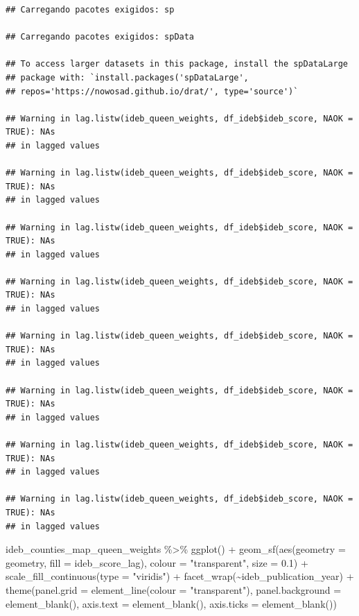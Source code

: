 \documentclass[
]{article}
\newenvironment{Shaded}{\begin{snugshade}}{\end{snugshade}}
\newcommand{\AttributeTok}[1]{\textcolor[rgb]{0.77,0.63,0.00}{#1}}
\newcommand{\FloatTok}[1]{\textcolor[rgb]{0.00,0.00,0.81}{#1}}
\newcommand{\FunctionTok}[1]{\textcolor[rgb]{0.00,0.00,0.00}{#1}}
\newcommand{\NormalTok}[1]{#1}
\newcommand{\SpecialCharTok}[1]{\textcolor[rgb]{0.00,0.00,0.00}{#1}}
\newcommand{\StringTok}[1]{\textcolor[rgb]{0.31,0.60,0.02}{#1}}
\begin{document}
\begin{verbatim}
## Carregando pacotes exigidos: sp

## Carregando pacotes exigidos: spData

## To access larger datasets in this package, install the spDataLarge
## package with: `install.packages('spDataLarge',
## repos='https://nowosad.github.io/drat/', type='source')`

## Warning in lag.listw(ideb_queen_weights, df_ideb$ideb_score, NAOK = TRUE): NAs
## in lagged values

## Warning in lag.listw(ideb_queen_weights, df_ideb$ideb_score, NAOK = TRUE): NAs
## in lagged values

## Warning in lag.listw(ideb_queen_weights, df_ideb$ideb_score, NAOK = TRUE): NAs
## in lagged values

## Warning in lag.listw(ideb_queen_weights, df_ideb$ideb_score, NAOK = TRUE): NAs
## in lagged values

## Warning in lag.listw(ideb_queen_weights, df_ideb$ideb_score, NAOK = TRUE): NAs
## in lagged values

## Warning in lag.listw(ideb_queen_weights, df_ideb$ideb_score, NAOK = TRUE): NAs
## in lagged values

## Warning in lag.listw(ideb_queen_weights, df_ideb$ideb_score, NAOK = TRUE): NAs
## in lagged values

## Warning in lag.listw(ideb_queen_weights, df_ideb$ideb_score, NAOK = TRUE): NAs
## in lagged values
\end{verbatim}

\begin{Shaded}
\begin{Highlighting}[]
\NormalTok{ideb\_counties\_map\_queen\_weights }\SpecialCharTok{\%\textgreater{}\%}
  \FunctionTok{ggplot}\NormalTok{() }\SpecialCharTok{+}
  \FunctionTok{geom\_sf}\NormalTok{(}\FunctionTok{aes}\NormalTok{(}\AttributeTok{geometry =}\NormalTok{ geometry, }\AttributeTok{fill =}\NormalTok{ ideb\_score\_lag),}
          \AttributeTok{colour =} \StringTok{"transparent"}\NormalTok{, }\AttributeTok{size =} \FloatTok{0.1}\NormalTok{) }\SpecialCharTok{+}
  \FunctionTok{scale\_fill\_continuous}\NormalTok{(}\AttributeTok{type =} \StringTok{"viridis"}\NormalTok{) }\SpecialCharTok{+}
  \FunctionTok{facet\_wrap}\NormalTok{(}\SpecialCharTok{\textasciitilde{}}\NormalTok{ideb\_publication\_year) }\SpecialCharTok{+}
  \FunctionTok{theme}\NormalTok{(}\AttributeTok{panel.grid =} \FunctionTok{element\_line}\NormalTok{(}\AttributeTok{colour =} \StringTok{"transparent"}\NormalTok{),}
        \AttributeTok{panel.background =} \FunctionTok{element\_blank}\NormalTok{(),}
        \AttributeTok{axis.text =} \FunctionTok{element\_blank}\NormalTok{(),}
        \AttributeTok{axis.ticks =} \FunctionTok{element\_blank}\NormalTok{())}
\end{Highlighting}
\end{Shaded}
\end{document}
